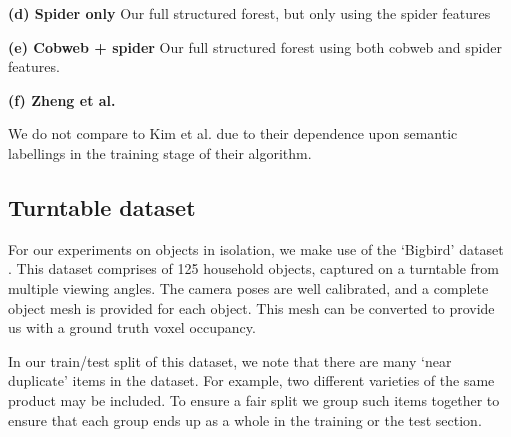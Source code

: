\documentclass[10pt,twocolumn,letterpaper]{article}
\makeatletter
\newcommand*{\ea}{et al.\@\xspace}
\makeatother
\begin{document}
\noindent \textbf{(d) Spider only} Our full structured forest, but only using the spider features

\noindent \textbf{(e) Cobweb + spider}  Our full structured forest using both cobweb and spider features.

\noindent \textbf{(f) Zheng \ea \cite{zheng-cvpr-2013}}



We do not compare to Kim \ea \cite{kim-iccv-2013} due to their dependence upon semantic labellings in the training stage of their algorithm.


\subsection{Turntable dataset}

For our experiments on objects in isolation, we make use of the `Bigbird' dataset \cite{singh-icra-2014}. 
This dataset comprises of 125 household objects, captured on a turntable from multiple viewing angles.
The camera poses are well calibrated, and a complete object mesh is provided for each object.
This mesh can be converted to provide us with a ground truth voxel occupancy.

In our train/test split of this dataset, we note that there are many `near duplicate' items in the dataset.
For example, two different varieties of the same product may be included.
To ensure a fair split we group such items together to ensure that each group ends up as a whole in the training or the test section.
\end{document}
